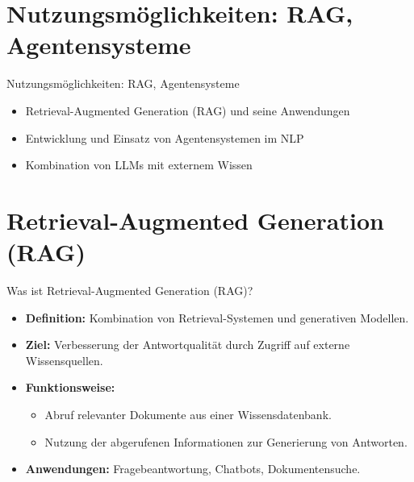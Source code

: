 \documentclass[aspectratio=1610, xcolor=dvipsnames, 9pt]{beamer}
\begin{document}
\section{Nutzungsmöglichkeiten: RAG, Agentensysteme}

\begin{frame}{Nutzungsmöglichkeiten: RAG, Agentensysteme}
  \begin{itemize}
    \item Retrieval-Augmented Generation (RAG) und seine Anwendungen \\
    \item Entwicklung und Einsatz von Agentensystemen im NLP \\
    \item Kombination von LLMs mit externem Wissen
  \end{itemize}
\end{frame}

\section{Retrieval-Augmented Generation (RAG)}

\begin{frame}{Was ist Retrieval-Augmented Generation (RAG)?}
  \begin{itemize}
    \item \textbf{Definition:} Kombination von Retrieval-Systemen und generativen Modellen.
    \item \textbf{Ziel:} Verbesserung der Antwortqualität durch Zugriff auf externe Wissensquellen.
    \item \textbf{Funktionsweise:}
      \begin{itemize}
        \item Abruf relevanter Dokumente aus einer Wissensdatenbank.
        \item Nutzung der abgerufenen Informationen zur Generierung von Antworten.
      \end{itemize}
    \item \textbf{Anwendungen:} Fragebeantwortung, Chatbots, Dokumentensuche.
  \end{itemize}
\end{frame}
\end{document}
